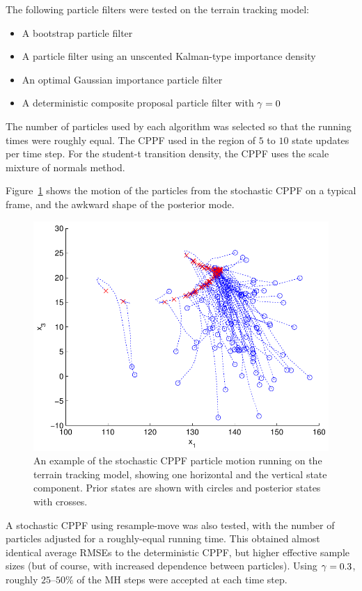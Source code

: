 \documentclass{article}
\begin{document}
The following particle filters were tested on the terrain tracking model:
\begin{itemize}
  \item A bootstrap particle filter
  \item A particle filter using an unscented Kalman-type importance density
  \item An optimal Gaussian importance particle filter
  \item A deterministic composite proposal particle filter with $\gamma=0$
\end{itemize}

The number of particles used by each algorithm was selected so that the running times were roughly equal. The CPPF used in the region of $5$ to $10$ state updates per time step. For the student-t transition density, the CPPF uses the scale mixture of normals method.

Figure~\ref{fig:drone_example_frame} shows the motion of the particles from the stochastic CPPF on a typical frame, and the awkward shape of the posterior mode.%
%
\begin{figure}
\centering
\includegraphics[width=0.45\columnwidth]{drone_example_frame.pdf}
\caption{An example of the stochastic CPPF particle motion running on the terrain tracking model, showing one horizontal and the vertical state component. Prior states are shown with circles and posterior states with crosses.}
\label{fig:drone_example_frame}
\end{figure}

A stochastic CPPF using resample-move was also tested, with the number of particles adjusted for a roughly-equal running time. This obtained almost identical average RMSEs to the deterministic CPPF, but higher effective sample sizes (but of course, with increased dependence between particles). Using $\gamma=0.3$, roughly $25$--$50\%$ of the MH steps were accepted at each time step.
\end{document}
